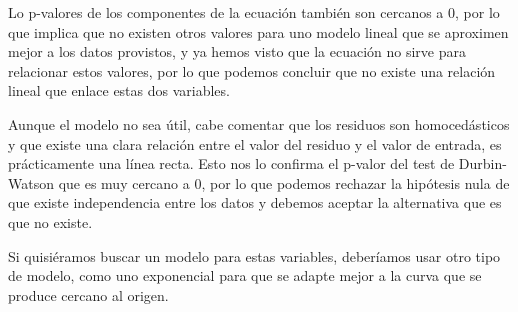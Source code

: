 \documentclass{article}
\begin{document}
Lo p-valores de los componentes de la ecuación también son cercanos a 0, por lo que implica que no existen otros valores para uno modelo lineal que se aproximen mejor a los datos provistos, y ya hemos visto que la ecuación no sirve para relacionar estos valores, por lo que podemos concluir que no existe una relación lineal que enlace estas dos variables.

Aunque el modelo no sea útil, cabe comentar que los residuos son homocedásticos y que existe una clara relación entre el valor del residuo y el valor de entrada, es prácticamente una línea recta. Esto nos lo confirma el p-valor del test de Durbin-Watson que es muy cercano a 0, por lo que podemos rechazar la hipótesis nula de que existe independencia entre los datos y debemos aceptar la alternativa que es que no existe.

Si quisiéramos buscar un modelo para estas variables, deberíamos usar otro tipo de modelo, como uno exponencial para que se adapte mejor a la curva que se produce cercano al origen.
\end{document}
